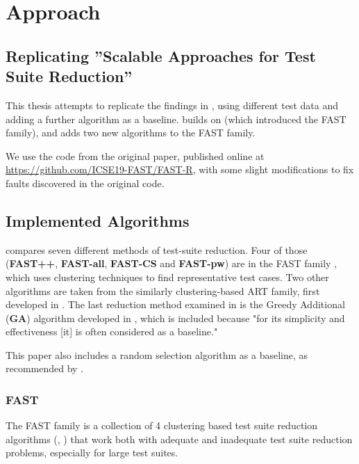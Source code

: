 
\chapter{Approach}\label{chapter:approach}

\section{Replicating ''Scalable Approaches for Test Suite Reduction''}

This thesis attempts to replicate the findings in
\cite{cruciani2019scalable}, using different test data and adding a
further algorithm as a baseline. \cite{cruciani2019scalable} builds on
\cite{miranda2018fast} (which introduced the FAST family), and adds two
new algorithms to the FAST family.

We use the code from the original paper, published online at
\url{https://github.com/ICSE19-FAST/FAST-R}, with some slight
modifications to fix faults discovered in the original code.

\section{Implemented Algorithms}

\cite{cruciani2019scalable} compares seven different methods of
test-suite reduction. Four of those (\textbf{FAST++}, \textbf{FAST-all},
\textbf{FAST-CS} and \textbf{FAST-pw}) are in the FAST family , which
uses clustering techniques to find representative test cases. Two
other algorithms are taken from the similarly clustering-based ART
family, first developed in \cite{chen2010adaptive}. The last reduction
method examined in \cite{cruciani2019scalable} is the Greedy Additional
(\textbf{GA}) algorithm developed in \cite{rothermel2001prioritizing},
which is included because "for its simplicity and effectiveness [it]
is often considered as a baseline."

This paper also includes a random selection algorithm as a baseline,
as recommended by \cite{khan2018systematic}.

\subsection{FAST}

The FAST family is a collection of 4 clustering based test suite reduction
algorithms  (\cite{miranda2018fast}, \cite{cruciani2019scalable}) that
work both with adequate and inadequate test suite reduction problems,
especially for large test suites.

